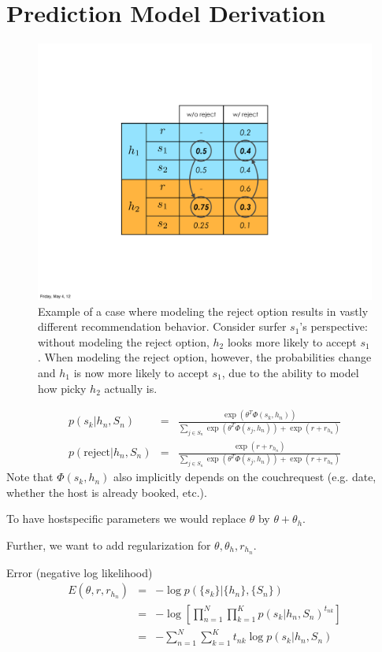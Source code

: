 \section{Prediction Model Derivation}

\begin{figure}[ht]
\centering
\includegraphics[width=0.6\linewidth]{figures/reject_vs_no_reject.pdf}
\caption{
Example of a case where modeling the reject option results in vastly different recommendation behavior.
Consider surfer $s_1$'s perspective: without modeling the reject option, $h_2$ looks more likely to accept $s_1$.
When modeling the reject option, however, the probabilities change and $h_1$ is now more likely to accept $s_1$, due to the ability to model how picky $h_2$ actually is.}
\label{fig:reject_vs_no_reject}
\end{figure}

\begin{eqnarray}
p(s_k | h_n, S_n) &=& \frac{\exp(\theta^T \Phi(s_k,h_n))}{\sum_{j \in S_n} \exp(\theta^T \Phi(s_j,h_n)) + \exp(r + r_{h_n})} \\
p(\text{reject} | h_n, S_n) &=& \frac{\exp(r+r_{h_n})}{\sum_{j \in S_n} \exp(\theta^T \Phi(s_j,h_n)) + \exp(r + r_{h_n})}
\end{eqnarray}
Note that $\Phi(s_k,h_n)$ also implicitly depends on the couchrequest (e.g. date, whether the host is already booked, etc.).

To have hostspecific parameters we would replace $\theta$ by $\theta + \theta_h$. 

Further, we want to add regularization for $\theta, \theta_h, r_{h_n}$.

Error (negative log likelihood)
\begin{eqnarray}
E(\theta, r, r_{h_n}) &=& - \log p(\{s_k\} | \{h_n\}, \{S_n\})\\
&=& - \log [ \prod_{n=1}^N \prod_{k=1}^K p(s_k | h_n, S_n)^{t_{nk}}]\\
&=&  - \sum_{n=1}^N \sum_{k=1}^K t_{nk} \log p(s_k | h_n, S_n)
\end{eqnarray}

